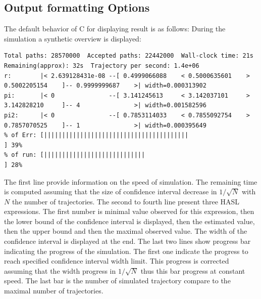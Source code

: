 \documentclass{article}
\newcommand{\cosmos}{\mbox{\textup{C}\scalebox{0.75}{{\textsc{OSMOS}}}}}
\begin{document}
\subsection{Output formatting Options}
The default behavior of \cosmos{} for displaying result is as follows:
During the simulation a synthetic overview is displayed:
\begin{scriptsize}
\begin{verbatim}
Total paths: 28570000  Accepted paths: 22442000  Wall-clock time: 21s  Remaining(approx): 32s  Trajectory per second: 1.4e+06
r:        |< 2.639128431e-08 --[ 0.4999066088    < 0.5000635601    > 0.5002205154    ]-- 0.9999999687    >| width=0.000313902
pi:       |< 0               --[ 3.141245613     < 3.142037101     > 3.142828210     ]-- 4               >| width=0.001582596
pi2:      |< 0               --[ 0.7853114033    < 0.7855092754    > 0.7857070525    ]-- 1               >| width=0.000395649
% of Err: [||||||||||||||||||||||||||||||||||||||||                                                       ] 39%	
% of run: [||||||||||||||||||||||||||||                                                                   ] 28%	
\end{verbatim}
\end{scriptsize}
The first line provide information on the speed of simulation. The
remaining time is computed assuming that the size of confidence
interval decrease in $1/\sqrt{N}$ with $N$ the number of trajectories.
The second to fourth line present three HASL expressions. The first
number is minimal value observed for this expression, then the lower
bound of the confidence interval is displayed, then the estimated
value, then the upper bound and then the maximal observed value. The
width of the confidence interval is displayed at the end.  The last
two lines show progress bar indicating the progress of the
simulation. The first one indicate the progress to reach specified
confidence interval width limit. This progress is corrected assuming
that the width progress in $1/\sqrt{N}$ thus this bar progress at
constant speed. The last bar is the number of simulated trajectory 
compare to the maximal number of trajectories.
\end{document}

